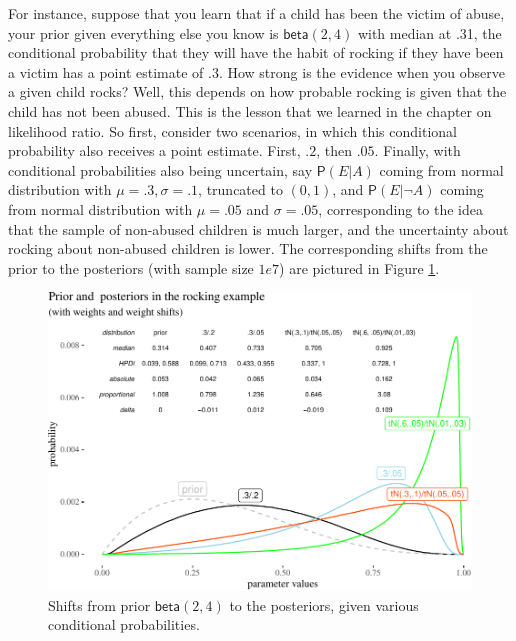 \documentclass[
  10pt,
  dvipsnames,enabledeprecatedfontcommands]{scrartcl}
\newcommand{\n}{\neg}
\newcommand{\pr}[1]{\mathsf{P}(#1)}
\begin{document}
For instance, suppose that you learn that if a child has been the victim
of abuse, your prior given everything else you know is
\(\mathsf{beta}(2,4)\) with median at .31, the conditional probability
that they will have the habit of rocking if they have been a victim has
a point estimate of .3. How strong is the evidence when you observe a
given child rocks? Well, this depends on how probable rocking is given
that the child has not been abused. This is the lesson that we learned
in the chapter on likelihood ratio. So first, consider two scenarios, in
which this conditional probability also receives a point estimate.
First, \(.2\), then \(.05\). Finally, with conditional probabilities
also being uncertain, say \(\pr{E \vert A}\) coming from normal
distribution with \(\mu = .3, \sigma = .1\), truncated to \((0,1)\), and
\(\pr{E\vert \n A}\) coming from normal distribution with \(\mu = .05\)
and \(\sigma = .05\), corresponding to the idea that the sample of
non-abused children is much larger, and the uncertainty about rocking
about non-abused children is lower. The corresponding shifts from the
prior to the posteriors (with sample size \(1e7\)) are pictured in
Figure \ref{fig:abuse1}.

\begin{figure}[H]

\begin{center}\includegraphics[width=1\linewidth]{imprecision_weight_files/figure-latex/fig:abuse4d-1} \end{center}
\caption{Shifts from prior $\mathsf{beta}(2,4)$ to the posteriors, given various conditional probabilities.}
\label{fig:abuse1}
\end{figure}
\end{document}
